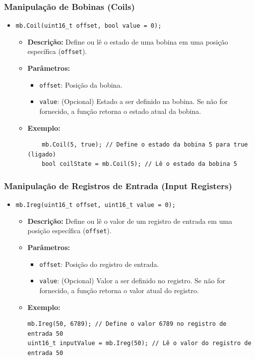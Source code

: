 \subsubsection{Manipulação de Bobinas (Coils)}
\begin{itemize}
    \item \texttt{mb.Coil(uint16\_t offset, bool value = 0);}
    \begin{itemize}
        \item \textbf{Descrição:} Define ou lê o estado de uma bobina em uma posição específica (\texttt{offset}).
        \item \textbf{Parâmetros:}
        \begin{itemize}
            \item \texttt{offset}: Posição da bobina.
            \item \texttt{value}: (Opcional) Estado a ser definido na bobina. Se não for fornecido, a função retorna o estado atual da bobina.
        \end{itemize}
        \item \textbf{Exemplo:}
        \begin{verbatim}
    mb.Coil(5, true); // Define o estado da bobina 5 para true (ligado)
    bool coilState = mb.Coil(5); // Lê o estado da bobina 5
        \end{verbatim}
    \end{itemize}
\end{itemize}

\subsubsection{Manipulação de Registros de Entrada (Input Registers)}
\begin{itemize}
    \item \texttt{mb.Ireg(uint16\_t offset, uint16\_t value = 0);}
    \begin{itemize}
        \item \textbf{Descrição:} Define ou lê o valor de um registro de entrada em uma posição específica (\texttt{offset}).
        \item \textbf{Parâmetros:}
        \begin{itemize}
            \item \texttt{offset}: Posição do registro de entrada.
            \item \texttt{value}: (Opcional) Valor a ser definido no registro. Se não for fornecido, a função retorna o valor atual do registro.
        \end{itemize}
        \item \textbf{Exemplo:}
        \begin{verbatim}
mb.Ireg(50, 6789); // Define o valor 6789 no registro de entrada 50
uint16_t inputValue = mb.Ireg(50); // Lê o valor do registro de entrada 50
        \end{verbatim}
    \end{itemize}
\end{itemize}


